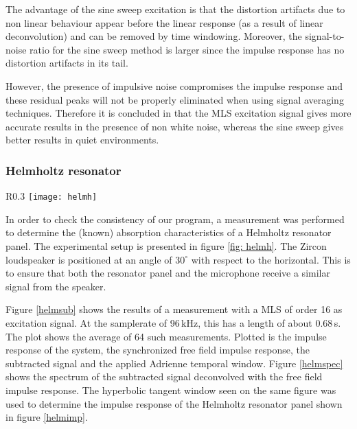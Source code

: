 The advantage of the sine sweep excitation is that the distortion artifacts due to non linear behaviour appear before the linear response (as a result of linear deconvolution) and can be removed by time windowing\cite{Geetere}.  Moreover, the signal-to-noise ratio for the sine sweep method is larger since the impulse response has no distortion artifacts in its tail\cite{Stan}.   

However, the presence of impulsive noise compromises the impulse response and these residual peaks will not be properly eliminated when using signal averaging techniques. Therefore it is concluded in \cite{Stan} that the MLS excitation signal gives more accurate results in  the presence of non white noise, whereas the sine sweep gives better results in quiet environments. 






\subsubsection{Helmholtz resonator}

\begin{wrapfigure}{R}{0.3\textwidth}
  \centering
    \texttt{[image: helmh]}
  \caption{Experimental setup for the measurement of the characteristics of the Helmholtz resonator panel.}
  \label{fig: helmh}
\end{wrapfigure}
In order to check the consistency of our program, a measurement was performed to determine the (known) absorption characteristics of a Helmholtz resonator panel. The experimental setup is presented in figure \ref{fig: helmh}. The Zircon loudspeaker is positioned at an angle of $30^{\circ}$ with  respect to the horizontal. This is to ensure that both the resonator panel and the microphone receive a similar signal from the speaker.

Figure \ref{helmsub} shows the results of a measurement with a MLS of order 16 as excitation signal. At the samplerate of 96\,kHz, this has a length of about 0.68\,s. The plot shows the average of 64 such measurements. Plotted is the impulse response of the system, the synchronized free field impulse response, the subtracted signal and the applied Adrienne temporal window. Figure \ref{helmspec} shows the spectrum of the subtracted signal deconvolved with the free field impulse response. The hyperbolic tangent window seen on the same figure was used to determine the impulse response of the Helmholtz resonator panel shown in figure \ref{helmimp}.
 
